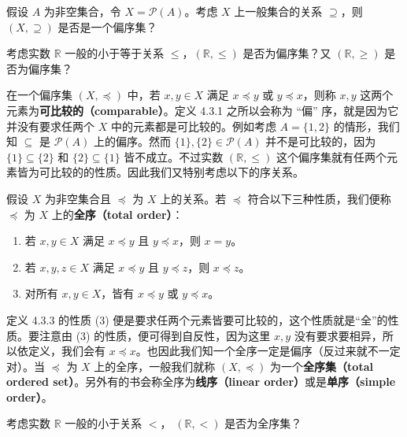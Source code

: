 \begin{question}
假设 $A$ 为非空集合，令 $X = \mathcal{P}(A)$。考虑 $X$ 上一般集合的关系 $\supseteq$，则 $(X, \supseteq)$ 是否是一个偏序集？
\end{question}

\begin{question}
考虑实数 $\mathbb{R}$ 一般的小于等于关系 $\leq$，$(\mathbb{R}, \leq)$ 是否为偏序集？又 $(\mathbb{R}, \geq)$ 是否为偏序集？
\end{question}

在一个偏序集 $(X, \preceq)$ 中，若 $x, y \in X$ 满足 $x \preceq y$ 或 $y \preceq x$，则称 $x, y$ 这两个元素为\textbf{可比较的（comparable）}。定义 4.3.1 之所以会称为 “偏” 序，就是因为它并没有要求任两个 $X$ 中的元素都是可比较的。例如考虑 $A = \{1, 2\}$ 的情形，我们知 $\subseteq$ 是 $\mathcal{P}(A)$ 上的偏序。然而 $\{1\}, \{2\} \in \mathcal{P}(A)$ 并不是可比较的，因为 $\{1\} \subseteq \{2\}$ 和 $\{2\} \subseteq \{1\}$ 皆不成立。不过实数 $(\mathbb{R}, \leq)$ 这个偏序集就有任两个元素皆为可比较的的性质。因此我们又特别考虑以下的序关系。

\begin{definition}
假设 $X$ 为非空集合且 $\preceq$ 为 $X$ 上的关系。若 $\preceq$ 符合以下三种性质，我们便称 $\preceq$ 为 $X$ 上的{\bf 全序（total order）}：
\begin{enumerate}
    \item 若 $x, y \in X$ 满足 $x \preceq y$ 且 $y \preceq x$，则 $x = y$。
    \item 若 $x, y, z \in X$ 满足 $x \preceq y$ 且 $y \preceq z$，则 $x \preceq z$。
    \item 对所有 $x, y \in X$，皆有 $x \preceq y$ 或 $y \preceq x$。
\end{enumerate}
\end{definition}

定义 4.3.3 的性质 (3) 便是要求任两个元素皆要可比较的，这个性质就是“全”的性质。要注意由 (3) 的性质，便可得到自反性，因为这里 $x, y$ 没有要求要相异，所以依定义，我们会有 $x \preceq x$。也因此我们知一个全序一定是偏序（反过来就不一定对）。当 $\preceq$ 为 $X$ 上的全序，一般我们就称 $(X, \preceq)$ 为一个{\bf 全序集（total ordered set）}。另外有的书会称全序为{\bf 线序（linear order）}或是{\bf 单序（simple order）}。

\begin{question}
考虑实数 $\mathbb{R}$ 一般的小于关系 $<$， $(\mathbb{R}, <)$ 是否为全序集？
\end{question}

